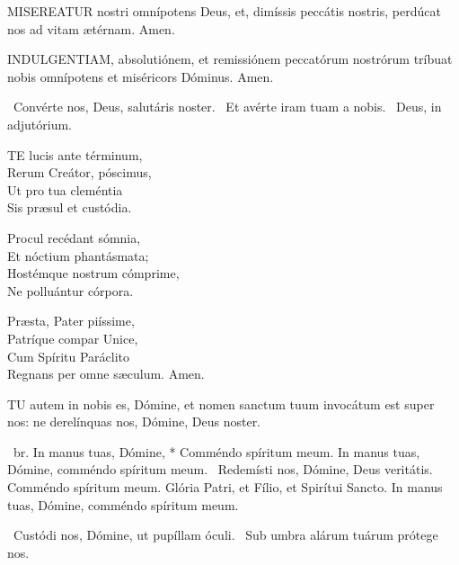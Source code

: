 
\lettrine[lines=2]{M}{ISEREATUR} nostri omnípotens Deus, et, dimíssis peccátis nostris, perdúcat nos ad vitam ætérnam. Amen.

\lettrine[lines=2]{I}{NDULGENTIAM}, absolutiónem, et remissiónem peccatórum nostrórum tríbuat nobis omnípotens et miséricors Dóminus. Amen.


\V\ Convérte nos, Deus, salutáris noster. \R\ Et avérte iram tuam a nobis. \V\ Deus, in adjutórium.




\lettrine[lines=2]{T}{E} lucis ante términum,\\
Rerum Creátor, póscimus,\\
Ut pro tua cleméntia\\
Sis præsul et custódia.

Procul recédant sómnia,\\
Et nóctium phantásmata;\\
Hostémque nostrum cómprime,\\
Ne polluántur córpora.

Præsta, Pater piíssime,\\
Patríque compar Unice,\\
Cum Spíritu Paráclito\\
Regnans per omne sæculum. Amen.



\lettrine[lines=2]{T}{U} autem in nobis es, Dómine, et nomen sanctum tuum invocátum est super nos: ne derelínquas nos, Dómine, Deus noster.

\R\ br. In manus tuas, Dómine, * Comméndo spíritum meum. In manus tuas, Dómine, comméndo spíritum meum. \V\ Redemísti nos, Dómine, Deus veritátis. Comméndo spíritum meum. Glória Patri, et Fílio, et Spirítui Sancto. In manus tuas, Dómine, comméndo spíritum meum.

\V\ Custódi nos, Dómine, ut pupíllam óculi. \R\ Sub umbra alárum tuárum prótege nos.


